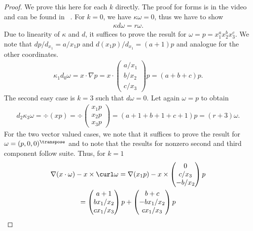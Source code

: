 \begin{proof}
  We prove this here
  for each $k$ directly. The proof for forms is in the video and can be found in ~\cite{ArnoldFalkWinther06acta}. For $k=0$, we have $\kappa\omega = 0$, thus
  we have to show
  \begin{gather}
    \kappa d\omega = r\omega.
  \end{gather}
  Due to linearity of $\kappa$ and $d$, it suffices to prove the
  result for $\omega = p=x_1^ax_2^bx_3^c$. We note that $dp/d_{x_1} =
  a/x_1 p$ and $d(x_1 p)/d_{x_1} = (a+1) p$ and analogue for the other
  coordinates.
  \begin{gather}
    \kappa_1 d_0\omega = x\cdot \nabla p = x\cdot
    \begin{pmatrix}
      a/x_1\\b/x_2\\c/x_3
    \end{pmatrix}p
    = (a+b+c)p.
  \end{gather}
  The second easy case is $k=3$ such that $d\omega = 0$. Let again
  $\omega = p$ to obtain
  \begin{gather}
    d_2\kappa_3 \omega = \div(xp) = \div
    \begin{pmatrix}
      x_1 p \\x_2 p \\x_3 p
    \end{pmatrix}
    = (a+1+b+1+c+1) p = (r+3) \omega.
  \end{gather}
  For the two vector valued cases, we note that it suffices to prove
  the result for $\omega = (p,0,0)^\transpose$ and to note that the results for
  nonzero second and third component follow suite. Thus, for $k=1$
  \begin{multline}
    \nabla (x\cdot \omega) - x\times \curl \omega
    = \nabla(x_1 p) - x\times
    \begin{pmatrix}
      0\\c/x_3 \\ -b/x_2
    \end{pmatrix}p
    \\
    =
    \begin{pmatrix}
      a+1 \\ bx_1/x_2\\ cx_1/x_3
    \end{pmatrix}p
    +
    \begin{pmatrix}
      b+c \\ -bx_1/x_2\\cx_1/x_3
    \end{pmatrix}p

\end{multline}
\end{proof}
